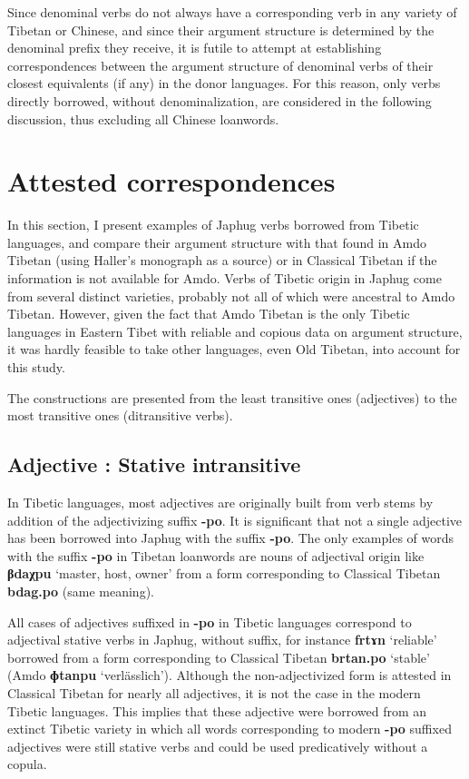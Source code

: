 \documentclass[oneside,a4paper,11pt]{article}
\newcommand{\ipa}[1]{{\phon\textbf{\mbox{#1}}}} %
\begin{document}
Since denominal verbs do not always have a corresponding verb in any variety of Tibetan or Chinese, and since their argument structure is determined by the denominal prefix they receive, it is futile to attempt at establishing correspondences between the argument structure of denominal verbs of their closest equivalents (if any) in the donor languages. For this reason, only verbs directly borrowed, without denominalization, are considered in the following discussion, thus excluding all Chinese loanwords.
 
  \section{Attested correspondences} 
 In this section, I present examples of Japhug verbs borrowed from Tibetic languages, and compare their argument structure with that found in Amdo Tibetan (using Haller's \citeyear{haller04themchen} monograph as a source) or in Classical Tibetan if the information is not available for Amdo. Verbs of Tibetic origin in Japhug come from several distinct varieties, probably not all of which were ancestral to Amdo Tibetan. However, given the fact that Amdo Tibetan is the only Tibetic languages in Eastern Tibet with reliable and copious data on argument structure, it was hardly feasible to take other languages, even Old Tibetan, into account for this study.
 
 The constructions are presented from the least transitive ones (adjectives) to the most transitive ones (ditransitive verbs). 
   
  \subsection{Adjective : Stative intransitive}  
In Tibetic languages, most adjectives are originally built from verb stems by addition of the adjectivizing suffix \ipa{-po}. It is significant that not a single adjective has been borrowed into Japhug with the suffix \ipa{-po}. The only examples of words with the suffix \ipa{-po} in Tibetan loanwords are nouns of adjectival origin like \ipa{βdaχpu} `master, host, owner' from a form corresponding to Classical Tibetan \ipa{bdag.po} (same meaning).

All cases of adjectives suffixed in \ipa{-po} in Tibetic languages correspond to adjectival stative verbs in Japhug, without suffix, for instance \ipa{frtɤn} `reliable' borrowed from a form corresponding to Classical Tibetan \ipa{brtan.po} `stable' (Amdo \ipa{ɸtanpu} `verlässlich'). Although the non-adjectivized form is attested in Classical Tibetan for nearly all adjectives, it is not the case in the modern Tibetic languages. This implies that these adjective were borrowed from an extinct Tibetic variety in which all words corresponding to modern \ipa{-po} suffixed adjectives were still stative verbs and could be used predicatively without a copula.
\end{document}
